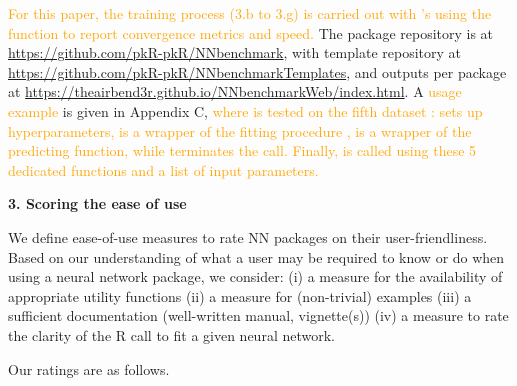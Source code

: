 \textcolor{orange}{For this paper, the training process (3.b to 3.g) is
carried out with 's  using 
the  function to report convergence metrics and speed.}
The package repository is at
\url{https://github.com/pkR-pkR/NNbenchmark}, with template repository
at \url{https://github.com/pkR-pkR/NNbenchmarkTemplates}, and outputs
per package at
\textcolor{blue}{\url{https://theairbend3r.github.io/NNbenchmarkWeb/index.html}.}
A \textcolor{orange}{usage example}  is given
in Appendix C,
\textcolor{orange}{where  is tested on the fifth dataset
:  sets up hyperparameters,
 is a wrapper of the fitting procedure ,
 is a wrapper of the predicting function,
while  terminates the call.
Finally,  is called using these 5 
dedicated functions and a list of input parameters.
}

\textbf{3. Scoring the ease of use}

We define ease-of-use measures to rate NN packages on their
user-friendliness. Based on our understanding of what a user may be
required to know or do when using a neural network package, we consider:
(i) a measure for the availability of appropriate utility functions (ii)
a measure for (non-trivial) examples (iii) a sufficient documentation
(well-written manual, vignette(s)) (iv) a measure to rate the clarity of
the \textsf{R} call to fit a given neural network.

Our ratings are as follows.

